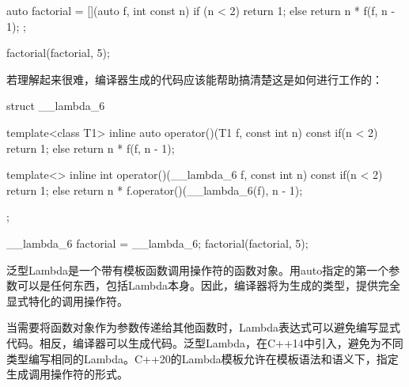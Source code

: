 \begin{cppcode}
auto factorial = [](auto f, int const n) {
	if (n < 2) return 1;
	else return n * f(f, n - 1);
};

factorial(factorial, 5);
\end{cppcode}

若理解起来很难，编译器生成的代码应该能帮助搞清楚这是如何进行工作的：

\begin{cppcode}
struct __lambda_6
{
	template<class T1>
	inline auto operator()(T1 f, const int n) const
	{
		if(n < 2) return 1;
		else return n * f(f, n - 1);
	}

	template<>
	inline int operator()(__lambda_6 f, const int n) const
	{
		if(n < 2) return 1;
		else return n * f.operator()(__lambda_6(f), n - 1);
	}
};

__lambda_6 factorial = __lambda_6{};
factorial(factorial, 5);
\end{cppcode}

泛型Lambda是一个带有模板函数调用操作符的函数对象。用auto指定的第一个参数可以是任何东西，包括Lambda本身。因此，编译器将为生成的类型，提供完全显式特化的调用操作符。

当需要将函数对象作为参数传递给其他函数时，Lambda表达式可以避免编写显式代码。相反，编译器可以生成代码。泛型Lambda，在C++14中引入，避免为不同类型编写相同的Lambda。C++20的Lambda模板允许在模板语法和语义下，指定生成调用操作符的形式。


